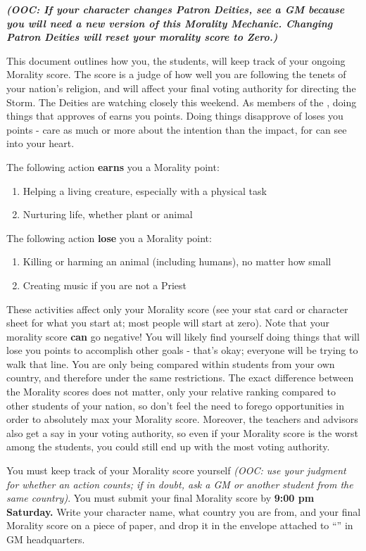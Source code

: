 \documentclass[green]{GL2020}
\begin{document}
\name{\gCoSStudentMorality{}}
\emph{\textbf{(OOC: If your character changes Patron Deities, see a GM because you will need a new version of this Morality Mechanic. Changing Patron Deities will reset your morality score to Zero.)}}

This document outlines how you, the students, will keep track of your ongoing Morality score. The score is a judge of how well you are following the tenets of your nation’s religion, and will affect your final voting authority for directing the Storm. The Deities are watching closely this weekend. As members of the \pFarm{}, doing things that \cFarmGod{} approves of earns you points. Doing things \cFarmGod{\they} disapprove\cFarmGod{\plural} of loses you points - \cFarmGod{\they} care as much or more about the intention than the impact, for \cFarmGod{\they} can see into your heart.

The following action \textbf{earns} you a Morality point:
\begin{enumerate}
  \item Helping a living creature, especially with a physical task
  \item Nurturing life, whether plant or animal
\end{enumerate}

The following action \textbf{lose} you a Morality point:
\begin{enumerate}
  \item Killing or harming an animal (including humans), no matter how small
  \item Creating music if you are not a Priest
\end{enumerate}

These activities affect only your Morality score (see your stat card or character sheet for what you start at; most people will start at zero).  Note that your morality score \textbf{can} go negative! You will likely find yourself doing things that will lose you points to accomplish other goals - that’s okay; everyone will be trying to walk that line. You are only being compared within students from your own country, and therefore under the same restrictions. The exact difference between the Morality scores does not matter, only your relative ranking compared to other students of your nation, so don’t feel the need to forego opportunities in order to absolutely max your Morality score. Moreover, the teachers and advisors also get a say in your voting authority, so even if your Morality score is the worst among the students, you could still end up with the most voting authority. 

You must keep track of your Morality score yourself \emph{(OOC: use your judgment for whether an action counts; if in doubt, ask a GM or another student from the same country)}. You must submit your final Morality score by \textbf{9:00 pm Saturday.} Write your character name, what country you are from, and your final Morality score on a piece of paper, and drop it in the envelope attached to “\sSignV{}” in GM headquarters. 
\end{document}
